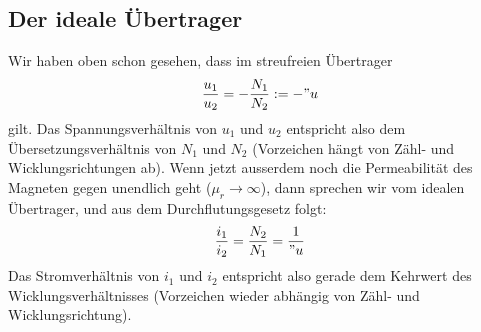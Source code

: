 \subsection{Der ideale Übertrager}
Wir haben oben schon gesehen, dass im streufreien Übertrager $$\frac{u_1}{u_2} = -\frac{N_1}{N_2} := -"u$$ gilt. Das Spannungsverhältnis von $u_1$ und $u_2$ entspricht also dem Übersetzungsverhältnis von $N_1$ und $N_2$ (Vorzeichen hängt von Zähl- und Wicklungsrichtungen ab). Wenn jetzt ausserdem noch die Permeabilität des Magneten gegen unendlich geht ($\mu_r \rightarrow \infty$), dann sprechen wir vom idealen Übertrager, und aus dem Durchflutungsgesetz folgt: $$\frac{i_1}{i_2}=\frac{N_2}{N_1} = \frac{1}{"u}$$
Das Stromverhältnis von $i_1$ und $i_2$ entspricht also gerade dem Kehrwert des Wicklungsverhältnisses (Vorzeichen wieder abhängig von Zähl- und Wicklungsrichtung). \newline

